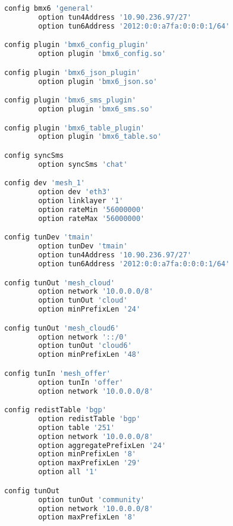 \begin{lstlisting}[language=bash, caption={BMX6}]
config bmx6 'general'
        option tun4Address '10.90.236.97/27'
        option tun6Address '2012:0:0:a7fa:0:0:0:1/64'

config plugin 'bmx6_config_plugin'
        option plugin 'bmx6_config.so'

config plugin 'bmx6_json_plugin'
        option plugin 'bmx6_json.so'

config plugin 'bmx6_sms_plugin'
        option plugin 'bmx6_sms.so'

config plugin 'bmx6_table_plugin'
        option plugin 'bmx6_table.so'

config syncSms
        option syncSms 'chat'

config dev 'mesh_1'
        option dev 'eth3'
        option linklayer '1'
        option rateMin '56000000'
        option rateMax '56000000'

config tunDev 'tmain'
        option tunDev 'tmain'
        option tun4Address '10.90.236.97/27'
        option tun6Address '2012:0:0:a7fa:0:0:0:1/64'

config tunOut 'mesh_cloud'
        option network '10.0.0.0/8'
        option tunOut 'cloud'
        option minPrefixLen '24'

config tunOut 'mesh_cloud6'
        option network '::/0'
        option tunOut 'cloud6'
        option minPrefixLen '48'

config tunIn 'mesh_offer'
        option tunIn 'offer'
        option network '10.0.0.0/8'

config redistTable 'bgp'
        option redistTable 'bgp'
        option table '251'
        option network '10.0.0.0/8'
        option aggregatePrefixLen '24'
        option minPrefixLen '8'
        option maxPrefixLen '29'
        option all '1'

config tunOut
        option tunOut 'community'
        option network '10.0.0.0/8'
        option maxPrefixLen '8'
\end{lstlisting}